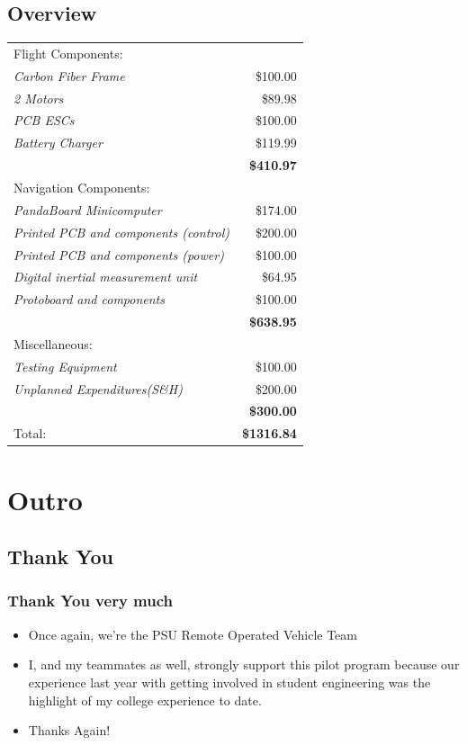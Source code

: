\documentclass{beamer}
\begin{document}
\subsection{Overview}
\frame
{
\footnotesize{    
\begin{center}
\begin{tabular}[t]{lr}
 Flight Components:   &\\
\indent \it  Carbon Fiber Frame                    &\$100.00\\
\indent \it  2 Motors                               &\$89.98\\
\indent \it  PCB ESCs                              &\$100.00\\
\indent \it  Battery Charger                       &\$119.99\\
\it                                        &\textbf{\$410.97}\\
 Navigation Components: &\\
\indent \it  PandaBoard Minicomputer               &\$174.00\\
\indent \it  Printed PCB and components (control)  &\$200.00\\
\indent \it  Printed PCB and components (power)    &\$100.00\\
\indent \it  Digital inertial measurement unit      &\$64.95\\
\indent \it  Protoboard and components             &\$100.00\\
\it                                        &\textbf{\$638.95}\\
 Miscellaneous:                       &\\
\indent \it  Testing Equipment                     &\$100.00\\
\indent \it  Unplanned Expenditures(S\&H)          &\$200.00\\
\it                                        &\textbf{\$300.00}\\\hline
 Total:                                   &\textbf{\$1316.84}\\
\end{tabular}
\end{center}
}
}

\section{Outro}
\subsection{Thank You}
\frame
{
    \frametitle{Thank You very much}

    \begin{itemize}
        \item Once again, we're the PSU Remote Operated Vehicle Team
        \item I, and my teammates as well, strongly support this pilot program because our experience last year with getting involved in student engineering was the highlight of my college experience to date. 
        \item Thanks Again!
    \end{itemize}
}
\end{document}
